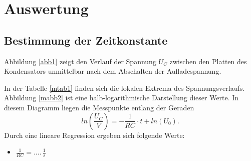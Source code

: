 \documentclass[11pt,ngerman,a4paper]{article}
\begin{document}
\section{Auswertung}
\subsection{Bestimmung der Zeitkonstante}
Abbildung \ref{abb1} zeigt den Verlauf der Spannung $U_C$ zwischen den Platten des Kondensators unmittelbar nach dem Abschalten der Aufladespannung.

In der Tabelle \ref{mtab1} finden sich die lokalen Extrema des Spannungsverlaufs. Abbildung \ref{mabb2} ist eine halb-logarithmische Darstellung dieser Werte. In diesem Diagramm liegen die Messpunkte entlang der Geraden
\begin{equation}
ln(\frac{U_C}{V}) = -\frac{1}{RC}\cdot t + ln(U_0).
\end{equation}
Durch eine lineare Regression ergeben sich folgende Werte:
\begin{itemize}
\item $\frac{1}{RC} = ....\,\frac{1}{s}$
\end{itemize}
\end{document}
